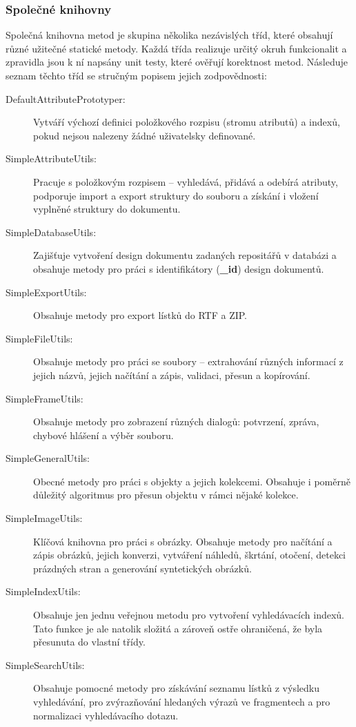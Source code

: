 \subsubsection{Společné knihovny}

Společná knihovna metod je skupina několika nezávislých tříd, které obsahují různé užitečné statické metody. Každá třída realizuje určitý okruh funkcionalit a zpravidla jsou k ní napsány unit testy, které ověřují korektnost metod. Následuje seznam těchto tříd se stručným popisem jejich zodpovědnosti:

\begin{description}
\item[DefaultAttributePrototyper:]{Vytváří výchozí definici položkového rozpisu (stromu atributů) a indexů, pokud nejsou nalezeny žádné uživatelsky definované.}
\item[SimpleAttributeUtils:]{Pracuje s položkovým rozpisem -- vyhledává, přidává a odebírá atributy, podporuje import a export struktury do souboru a získání i vložení vyplněné struktury do dokumentu.}
\item[SimpleDatabaseUtils:]{Zajišťuje vytvoření design dokumentu zadaných repositářů v databázi a obsahuje metody pro práci s identifikátory ({\bf \_id}) design dokumentů.}
\item[SimpleExportUtils:]{Obsahuje metody pro export lístků do RTF a ZIP.}
\item[SimpleFileUtils:]{Obsahuje metody pro práci se soubory -- extrahování různých informací z jejich názvů, jejich načítání a zápis, validaci, přesun a kopírování.}
\item[SimpleFrameUtils:]{Obsahuje metody pro zobrazení různých dialogů: potvrzení, zpráva, chybové hlášení a výběr souboru.}
\item[SimpleGeneralUtils:]{Obecné metody pro práci s objekty a jejich kolekcemi. Obsahuje i poměrně důležitý algoritmus pro přesun objektu v rámci nějaké kolekce.}
\item[SimpleImageUtils:]{Klíčová knihovna pro práci s obrázky. Obsahuje metody pro načítání a zápis obrázků, jejich konverzi, vytváření náhledů, škrtání, otočení, detekci prázdných stran a generování syntetických obrázků.}
\item[SimpleIndexUtils:]{Obsahuje jen jednu veřejnou metodu pro vytvoření vyhledávacích indexů. Tato funkce je ale natolik složitá a zároveň ostře ohraničená, že byla přesunuta do vlastní třídy.}
\item[SimpleSearchUtils:]{Obsahuje pomocné metody pro získávání seznamu lístků z výsledku vyhledávání, pro zvýrazňování hledaných výrazů ve fragmentech a pro normalizaci vyhledávacího dotazu.}

\end{description}
